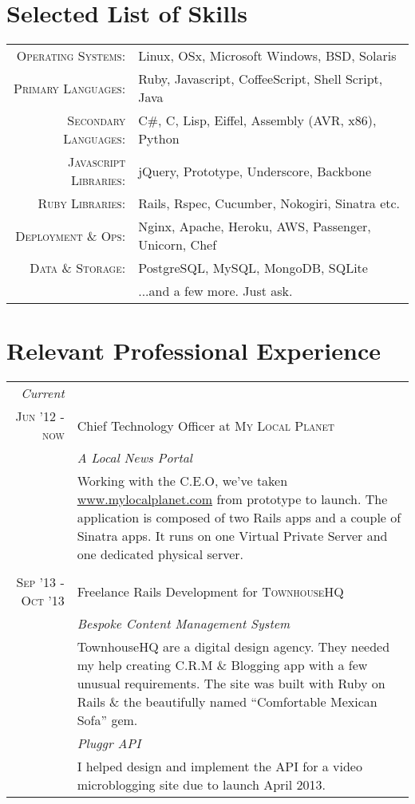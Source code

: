 \documentclass[a4paper,11pt]{article}
\begin{document}
\section{Selected List of Skills}
\begin{tabular}{rl}
  \textsc{Operating Systems:}& Linux, OSx, Microsoft Windows, BSD, Solaris\\
  \textsc{Primary Languages:}& Ruby, Javascript, CoffeeScript, Shell Script, Java\\
  \textsc{Secondary Languages:}& C\#, C, Lisp, Eiffel, Assembly (AVR, x86), Python\\
  \textsc{Javascript Libraries:} & jQuery, Prototype, Underscore, Backbone\\
  \textsc{Ruby Libraries:} & Rails, Rspec, Cucumber, Nokogiri, Sinatra etc.\\
  \textsc{Deployment \& Ops:} & Nginx, Apache, Heroku, AWS, Passenger, Unicorn, Chef\\
  \textsc{Data \& Storage:} & PostgreSQL, MySQL, MongoDB, SQLite\\
                   & ...and a few more. Just ask.
\end{tabular}

\section{Relevant Professional Experience}
\begin{tabular}{r|p{11.2cm}}
  \emph{Current} \\
  \textsc{Jun '12 - now} & Chief Technology Officer at \textsc{My Local Planet}\\
                         &\emph{A Local News Portal}\\
                         &\footnotesize{Working with the C.E.O, we've taken \href{www.mylocalplanet.com}{www.mylocalplanet.com}
  from prototype to launch. The application is composed of two Rails apps and a couple of Sinatra
  apps. It runs on one Virtual Private Server and one dedicated physical server.}
  \\\multicolumn{2}{c}{} \\
  \textsc{Sep '13 - Oct '13} & Freelance Rails Development for \textsc{TownhouseHQ} \\
                             &\emph{Bespoke Content Management System}\\
                             &\footnotesize{TownhouseHQ are a digital design agency. They needed my help
  creating C.R.M \& Blogging app with a few unusual requirements. The site was built with Ruby on
  Rails \& the beautifully named “Comfortable Mexican Sofa” gem.}\\
                             &\emph{Pluggr API}\\
                             &\footnotesize{I helped design and implement the API for a video
  microblogging site due to launch April 2013.}
\end{tabular}
\end{document}
